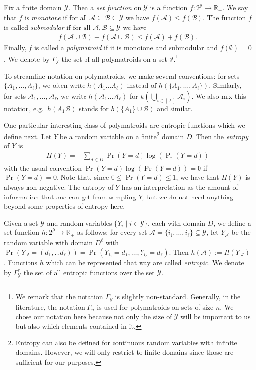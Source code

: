 \documentclass[a4paper,cleveref]{lipics-v2021}
\newcommand{\vset}[1]{\mathcal{#1}}
\begin{document}
Fix a finite domain $\vset Y$. Then a \emph{set function} on $\vset Y$ is a function $f:2^{\vset Y} \rightarrow \mathbb R_+$. 
We say that $f$ is \emph{monotone} if for all $\vset A \subseteq \vset B \subseteq \vset Y$ we have $f(\vset A) \le f(\vset B)$. The function $f$ is called \emph{submodular} if for all $\vset A, \vset B \subseteq \vset Y$ we have
\begin{align*}
	f(\vset A\cup \vset B) + f(\vset A\cup \vset B) \le f(\vset A) + f(\vset B).
\end{align*}
Finally, $f$ is called a \emph{polymatroid} if it is monotone and submodular and $f(\emptyset) = 0$. 
We denote by $\Gamma_{\vset Y}$ the set of all polymatroids on a set $\vset Y$.\footnote{We remark that the notation $\Gamma_{\vset Y}$ is slightly non-standard. 
Generally, in the literature, the notation $\Gamma_{n}$ is used for polymatroids on sets of size $n$. We chose our notation here because not only the size of $\vset Y$ will be important to us but also which elements contained in it.}

To streamline notation on polymatroids, we make several conventions: for sets $\{A_1, \ldots, A_\ell\}$, we often write $h(A_1\ldots A_\ell)$ instead of $h(\{A_1, \ldots, A_\ell\})$. Similarly, for sets $\vset A_1, \ldots, \vset A_\ell$, we write $h(\vset A_1 \ldots \vset A_\ell)$ for $h\left(\bigcup_{i\in [\ell]} \vset A_i\right)$. We also mix this notation, e.g.~$h(A_1\vset B)$ stands for $h(\{A_1\}\cup \vset B)$ and similar.

One particular interesting class of polymatroids are entropic functions which we define next. Let $Y$ be a random variable on a finite\footnote{Entropy can also be defined for continuous random variables with infinite domains. However, we will only restrict to finite domains since those are sufficient for our purposes.} domain $D$. Then the \emph{entropy} of $Y$ is 
\begin{align*}
	H(Y) = - \sum_{d\in D} \Pr(Y=d) \log(\Pr(Y=d)) 
\end{align*}
with the usual convention $  \Pr(Y=d) \log(\Pr(Y=d))=0$ if $ \Pr(Y=d) = 0$.
Note that, since $0\le \Pr(Y=d) \le 1$, we have that $H(Y)$ is always non-negative.
The entropy of $Y$ has an interpretation as the amount of information that one can get from sampling $Y$, but we do not need anything beyond some properties of entropy here.

Given a set $\vset Y$ and random variables $\{Y_i \mid i \in \vset Y\}$, each with domain $D$, we define a set function $h :2^{\vset Y} \rightarrow \mathbb R_+$ as follows: for every set $\vset A = \{i_1, \ldots, i_\ell \}\subseteq \vset Y$, let $Y_{\vset A}$ be the random variable with domain $D^\ell$ with $\Pr(Y_{\vset A}= (d_1, \ldots d_\ell)) = \Pr\left(Y_{i_1}= d_1, \ldots, Y_{i_\ell} = d_\ell\right)$. Then $h(\vset A) := H(Y_{\vset A})$. Functions $h$ which can be represented that way are called \emph{entropic}. We denote by $\Gamma^*_{\vset Y}$ the set of all entropic functions over the set $\vset Y$.
\end{document}
